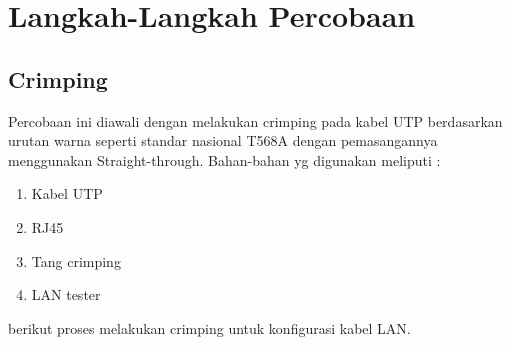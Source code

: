 \section{Langkah-Langkah Percobaan}
\subsection{Crimping}
Percobaan ini diawali dengan melakukan crimping pada kabel UTP berdasarkan urutan warna seperti standar nasional T568A dengan pemasangannya menggunakan Straight-through. Bahan-bahan yg digunakan meliputi :
\begin{enumerate}
    \item Kabel UTP
    \item RJ45
    \item Tang crimping 
    \item LAN tester 
\end{enumerate}
berikut proses melakukan crimping untuk konfigurasi kabel LAN. 
